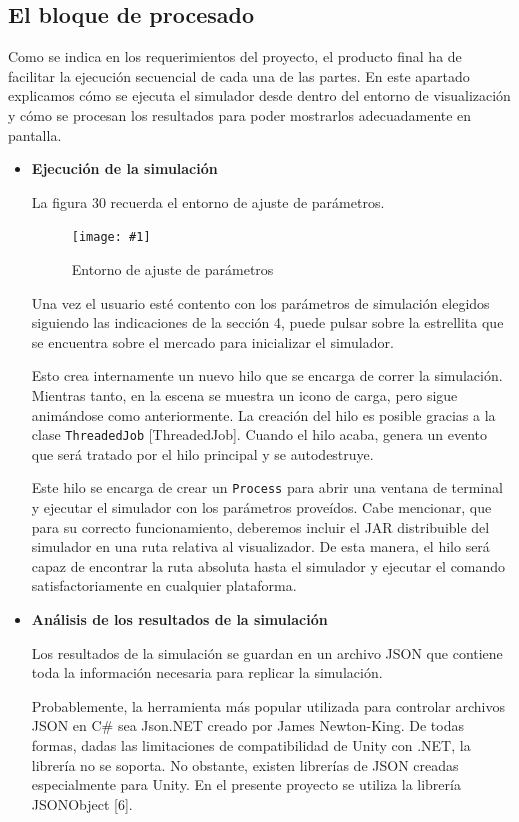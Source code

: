 \documentclass[12pt,a4paper,openright,oneside]{article}
\newcommand{\includeImage}[3]
{
	\begin{figure}[H]
	\begin{center}
	\texttt{[image: \#1]}
	\end{center}
	\caption{#3}
	\end{figure}
}
\numberwithin{equation}{section}
\theoremstyle{definition}
\begin{document}
\subsection{El bloque de procesado} 
Como se indica en los requerimientos del proyecto, el producto final ha de facilitar la ejecución secuencial de cada una de las partes. En este apartado explicamos cómo se ejecuta el simulador desde dentro del entorno de visualización y cómo se procesan los resultados para poder mostrarlos adecuadamente en pantalla.
\clearpage
\begin{itemize}
\item \textbf{Ejecución de la simulación}

La figura 30 recuerda el entorno de ajuste de parámetros.

\includeImage{entorno.png}{10}{Entorno de ajuste de parámetros}

Una vez el usuario esté contento con los parámetros de simulación elegidos siguiendo las indicaciones de la sección 4, puede pulsar sobre la estrellita que se encuentra sobre el mercado para inicializar el simulador.

Esto crea internamente un nuevo hilo que se encarga de correr la simulación. Mientras tanto, en la escena se muestra un icono de carga, pero sigue animándose como anteriormente.
La creación del hilo es posible gracias a la clase \texttt{ThreadedJob} [ThreadedJob].
Cuando el hilo acaba, genera un evento que será tratado por el hilo principal y se autodestruye.

Este hilo se encarga de crear un \texttt{Process} para abrir una ventana de terminal y ejecutar el simulador con los parámetros proveídos. Cabe mencionar, que para su correcto funcionamiento, deberemos incluir el JAR distribuible del simulador en una ruta relativa al visualizador. De esta manera, el hilo será capaz de encontrar la ruta absoluta hasta el simulador y ejecutar el comando satisfactoriamente en cualquier plataforma.

\item \textbf{Análisis de los resultados de la simulación}

Los resultados de la simulación se guardan en un archivo JSON que contiene toda la información necesaria para replicar la simulación. 

Probablemente, la herramienta más popular utilizada para controlar archivos JSON en C\# sea Json.NET creado por James Newton-King. De todas formas, dadas las limitaciones de compatibilidad de Unity con .NET, la librería no se soporta. No obstante, existen librerías de JSON creadas especialmente para Unity. En el presente proyecto se utiliza la librería JSONObject [6].


\end{itemize}
\end{document}
